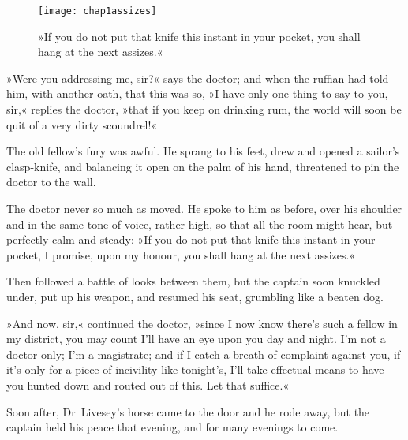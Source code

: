 \begin{figure}[p]
\centering
\texttt{[image: chap1assizes]}
\caption[»You shall hang at the next assizes.«]{»If you do not put that knife this instant in your pocket, you shall hang at the next assizes.«}
\end{figure}


»Were you addressing me, sir?« says the doctor; and when the ruffian had told him, with another oath, that this was so, »I have only one thing to say to you, sir,« replies the doctor, »that if you keep on drinking rum, the world will soon be quit of a very dirty scoundrel!«

The old fellow's fury was awful. He sprang to his feet, drew and opened a sailor's clasp-knife, and balancing it open on the palm of his hand, threatened to pin the doctor to the wall.

The doctor never so much as moved. He spoke to him as before, over his shoulder and in the same tone of voice, rather high, so that all the room might hear, but perfectly calm and steady: »If you do not put that knife this instant in your pocket, I promise, upon my honour, you shall hang at the next assizes.«


Then followed a battle of looks between them, but the captain soon knuckled under, put up his weapon, and resumed his seat, grumbling like a beaten dog.

»And now, sir,« continued the doctor, »since I now know there's such a fellow in my district, you may count I'll have an eye upon you day and night. I'm not a doctor only; I'm a magistrate; and if I catch a breath of complaint against you, if it's only for a piece of incivility like tonight's, I'll take effectual means to have you hunted down and routed out of this. Let that suffice.«

Soon after, Dr~Livesey's horse came to the door and he rode away, but the captain held his peace that evening, and for many evenings to come.
